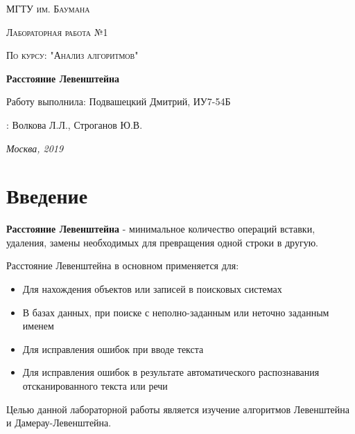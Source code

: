 \documentclass[12pt]{report}
\begin{document}
\begin{titlepage}
	\centering
	{\scshape\LARGE МГТУ им. Баумана \par}
	\vspace{3cm}
	{\scshape\Large Лабораторная работа №1\par}
	\vspace{0.5cm}	
	{\scshape\Large По курсу: "Анализ алгоритмов"\par}
	\vspace{1.5cm}
	{\huge\bfseries Расстояние Левенштейна\par}
	\vspace{2cm}
	\Large Работу выполнила: Подвашецкий Дмитрий, ИУ7-54Б\par
	\vspace{0.5cm}
	:  Волкова Л.Л., Строганов Ю.В.\par

	\vfill
	\large \textit {Москва, 2019} \par
\end{titlepage}

\tableofcontents

\newpage
\chapter*{Введение}
\textbf{Расстояние Левенштейна} - минимальное количество операций вставки, удаления, замены необходимых для превращения одной строки в другую.

Расстояние Левенштейна в основном применяется для:

\begin{itemize}
	\item Для нахождения объектов или записей в поисковых системах
	\item В базах данных, при поиске с неполно-заданным или неточно заданным именем
	\item Для исправления ошибок при вводе текста
	\item Для исправления ошибок в результате автоматического распознавания отсканированного текста или речи
\end{itemize}

Целью данной лабораторной работы является изучение алгоритмов Левенштейна и Дамерау-Левенштейна. 
\end{document}
